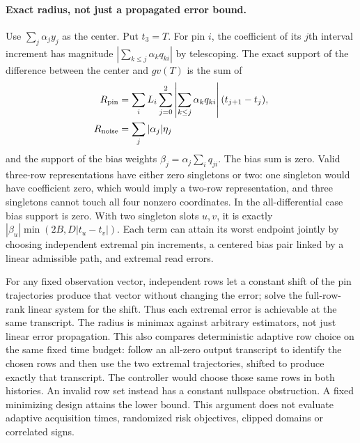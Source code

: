 \documentclass{article}
\begin{document}
\paragraph{Exact radius, not just a propagated error bound.}
Use $\sum_j\alpha_j y_j$ as the center. Put $t_3=T$.
For pin $i$, the coefficient of its $j$th interval increment
has magnitude $|\sum_{k\le j}\alpha_kq_{ki}|$ by telescoping. The
exact support of the difference between the center and $gv(T)$ is
the sum of
\begin{align*}
 R_{\rm pin}&=\sum_i L_i\sum_{j=0}^2
    \left|\sum_{k\le j}\alpha_kq_{ki}\right|(t_{j+1}-t_j),\\
 R_{\rm noise}&=\sum_j|\alpha_j|\eta_j
\end{align*}
and the support of the bias weights
$\beta_j=\alpha_j\sum_i q_{ji}$. The bias sum is zero. Valid
three-row representations have either zero singletons or two:
one singleton would have coefficient zero, which would imply a
two-row representation, and three singletons cannot touch all
four nonzero coordinates. In the all-differential case bias
support is zero. With two singleton slots $u,v$, it is exactly
$|\beta_u|\min(2B,D|t_u-t_v|)$. Each term can attain its
worst endpoint jointly by choosing independent extremal pin
increments, a centered bias pair linked by a linear admissible
path, and extremal read errors.

For any fixed observation vector, independent rows let a constant
shift of the pin trajectories produce that vector without changing
the error; solve the full-row-rank linear system for the shift.
Thus each extremal error is achievable at the same transcript.
The radius is minimax against arbitrary estimators, not just
linear error propagation. This also compares deterministic adaptive
row choice on the same fixed time budget: follow an all-zero
output transcript to identify the chosen rows and then use the
two extremal trajectories, shifted to produce exactly that
transcript. The controller would choose those same rows in both
histories. An invalid row set instead has a constant nullspace
obstruction. A fixed minimizing design attains the lower bound.
This argument does not evaluate adaptive acquisition times,
randomized risk objectives, clipped domains or correlated signs.
\end{document}
